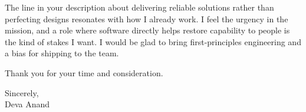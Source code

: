 \documentclass[letterpaper,11pt]{article}
\begin{document}
The line in your description about delivering reliable solutions rather than perfecting designs resonates with how I already work. I feel the urgency in the mission, and a role where software directly helps restore capability to people is the kind of stakes I want. I would be glad to bring first-principles engineering and a bias for shipping to the team.

Thank you for your time and consideration.

\vspace{6pt}

Sincerely, \\
Deva Anand
\end{document}
